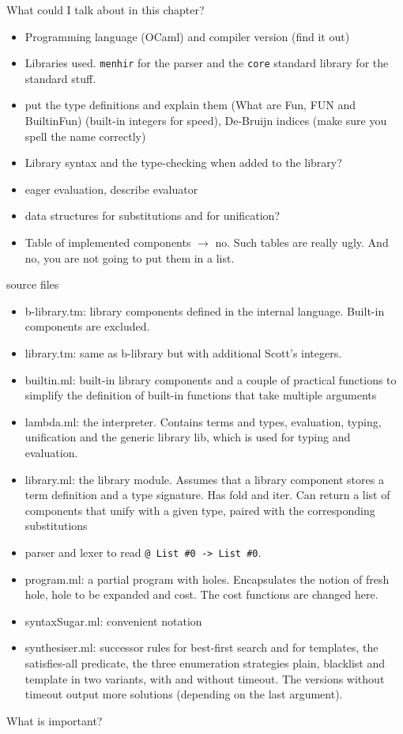 What could I talk about in this chapter?
\begin{itemize}
\item Programming language (OCaml) and compiler version (find it out)
\item Libraries used. \lstinline!menhir! for the parser and the \lstinline!core! standard library for the standard stuff.
\item put the type definitions and explain them (What are Fun, FUN and BuiltinFun) (built-in integers for speed), De-Bruijn indices (make sure you spell the name correctly)
\item Library syntax and the type-checking when added to the library?
\item eager evaluation, describe evaluator
\item data structures for substitutions and for unification?
\item Table of implemented components $\longrightarrow$ no. Such tables are really ugly. And no, you are not going to put them in a list.
\end{itemize}


source files
\begin{itemize}
\item b-library.tm: library components defined in the internal language. Built-in components are excluded.
\item library.tm: same as b-library but with additional Scott's integers.
\item builtin.ml: built-in library components and a couple of practical functions to simplify the definition of built-in functions that take multiple arguments
\item lambda.ml: the interpreter. Contains terms and types, evaluation, typing, unification and the generic library lib, which is used for typing and evaluation.
\item library.ml: the library module. Assumes that a library component stores a term definition and a type signature. Has fold and iter. Can return a list of components that unify with a given type, paired with the corresponding substitutions
\item parser and lexer to read \lstinline!@ List #0 -> List #0!.
\item program.ml: a partial program with holes. Encapsulates the notion of fresh hole, hole to be expanded and cost. The cost functions are changed here.
\item syntaxSugar.ml: convenient notation
\item synthesiser.ml: successor rules for best-first search and for templates, the satisfies-all predicate, the three enumeration strategies plain, blacklist and template in two variants, with and without timeout. The versions without timeout output more solutions (depending on the last argument).
\end{itemize}

What is important?



